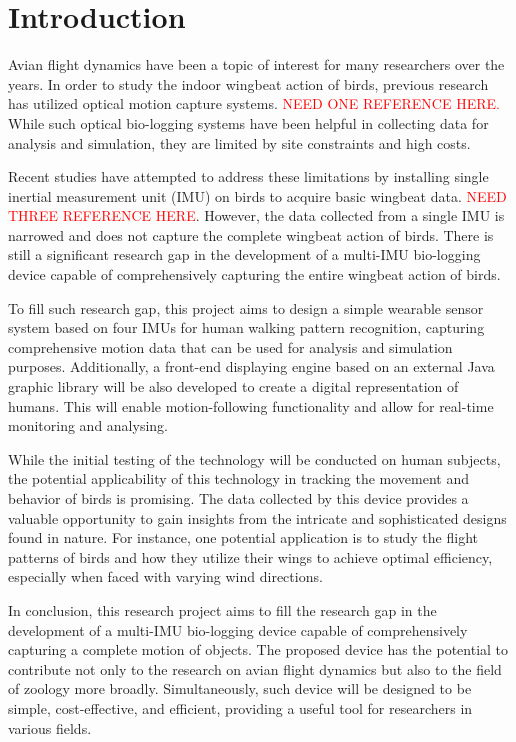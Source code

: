 \chapter{Introduction}
Avian flight dynamics have been a topic of interest for many researchers over the years.
In order to study the indoor wingbeat action of birds, previous research has utilized optical motion capture systems.
    \textcolor{red}{NEED ONE REFERENCE HERE.} %
While such optical bio-logging systems have been helpful in collecting data for analysis and simulation, they are limited by site constraints and high costs.

Recent studies have attempted to address these limitations by installing single inertial measurement unit (IMU) on birds to acquire basic wingbeat data.
\textcolor{red}{NEED THREE REFERENCE HERE}.
However, the data collected from a single IMU is narrowed and does not capture the complete wingbeat action of birds. There is still a significant research gap in the development of a multi-IMU bio-logging device capable of comprehensively capturing the entire wingbeat action of birds.

To fill such research gap, this project aims to design a simple wearable sensor system based on four IMUs for human walking pattern recognition, capturing comprehensive motion data that can be used for analysis and simulation purposes. Additionally, a front-end displaying engine based on an external Java graphic library will be also developed to create a digital representation of humans. This will enable motion-following functionality and allow for real-time monitoring and analysing.

While the initial testing of the technology will be conducted on human subjects, the potential applicability of this technology in tracking the movement and behavior of birds is promising. The data collected by this device provides a valuable opportunity to gain insights from the intricate and sophisticated designs found in nature. For instance, one potential application is to study the flight patterns of birds and how they utilize their wings to achieve optimal efficiency, especially when faced with varying wind directions.

In conclusion, this research project aims to fill the research gap in the development of a multi-IMU bio-logging device capable of comprehensively capturing a complete motion of objects. The proposed device has the potential to contribute not only to the research on avian flight dynamics but also to the field of zoology more broadly. Simultaneously, such device will be designed to be simple, cost-effective, and efficient, providing a useful tool for researchers in various fields.


